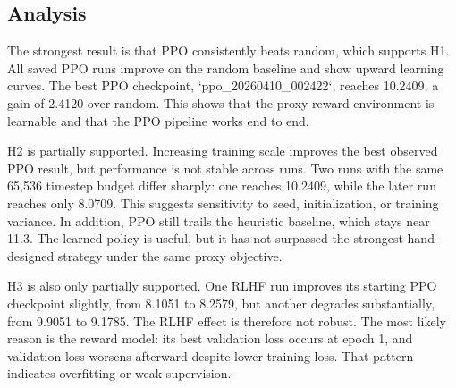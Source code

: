 \documentclass{article}
\begin{document}





\subsection{Analysis}

The strongest result is that PPO consistently beats random, which supports H1. All saved PPO runs improve on the random baseline and show upward learning curves. The best PPO checkpoint, `ppo\_20260410\_002422`, reaches 10.2409, a gain of 2.4120 over random. This shows that the proxy-reward environment is learnable and that the PPO pipeline works end to end.

H2 is partially supported. Increasing training scale improves the best observed PPO result, but performance is not stable across runs. Two runs with the same 65,536 timestep budget differ sharply: one reaches 10.2409, while the later run reaches only 8.0709. This suggests sensitivity to seed, initialization, or training variance. In addition, PPO still trails the heuristic baseline, which stays near 11.3. The learned policy is useful, but it has not surpassed the strongest hand-designed strategy under the same proxy objective.

H3 is also only partially supported. One RLHF run improves its starting PPO checkpoint slightly, from 8.1051 to 8.2579, but another degrades substantially, from 9.9051 to 9.1785. The RLHF effect is therefore not robust. The most likely reason is the reward model: its best validation loss occurs at epoch 1, and validation loss worsens afterward despite lower training loss. That pattern indicates overfitting or weak supervision.
\end{document}
